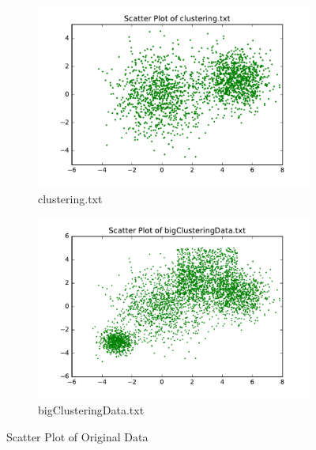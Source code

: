 \begin{figure}[H]
\centering
\centering
        \begin{subfigure}[b]{0.49\textwidth}
            \centering
            \includegraphics[width=\textwidth]{./figures/clustering_scatter.pdf}
            \caption{clustering.txt}\label{fig:16a}
        \end{subfigure}
        \hfill
        \begin{subfigure}[b]{0.49\textwidth}  
            \centering 
            \includegraphics[width=\textwidth]{./figures/bigClustering_scatter.pdf}
            \caption{bigClusteringData.txt}\label{fig:16b}
        \end{subfigure}
\caption{Scatter Plot of Original Data}
\label{fig:clusters} 
\end{figure}

